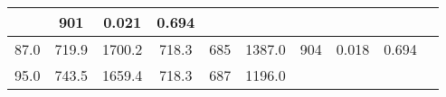 \documentclass[a4paper,10pt]{article}
\begin{document}
\begin{longtable}{
     |
%    
    c|
%    
    c|
%    
    c|
%    
    c|
%    
    c|
%    
    c|
%    
    c|
%    
    c|
%    
    c|
%    
    c|
%    
    }
%        
        & 901
%        

%        

%        
        & 0.021
%        

%        

%        
        & 0.694
%        

%        
        \\
        \hline

        

%        

%        
        87.0
%        

%        

%        
        & 719.9
%        

%        

%        
        & 1700.2
%        

%        

%        
        & 718.3
%        

%        

%        
        & 685
%        

%        

%        
        & 1387.0
%        

%        

%        
        & 904
%        

%        

%        
        & 0.018
%        

%        

%        
        & 0.694
%        

%        
        \\
        \hline

        

%        

%        
        95.0
%        

%        

%        
        & 743.5
%        

%        

%        
        & 1659.4
%        

%        

%        
        & 718.3
%        

%        

%        
        & 687
%        

%        

%        
        & 1196.0
%        

%        


\end{longtable}
\end{document}
